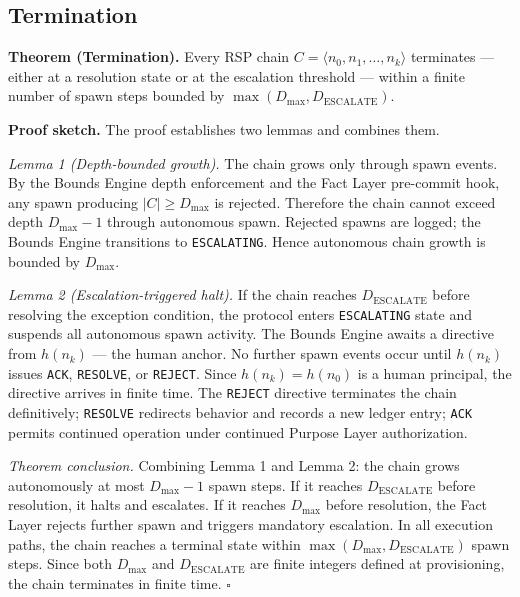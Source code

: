 \subsection{Termination}
\label{sec:rs-termination}

\medskip
\noindent\textbf{Theorem (Termination).} Every RSP chain $C = \langle n_0, n_1, \ldots, n_k \rangle$ terminates --- either at a resolution state or at the escalation threshold --- within a finite number of spawn steps bounded by $\max(D_{\mathrm{max}}, D_{\mathrm{ESCALATE}})$.

\medskip
\noindent\textbf{Proof sketch.} The proof establishes two lemmas and combines them.

\medskip
\textit{Lemma 1 (Depth-bounded growth).} The chain grows only through spawn events. By the Bounds Engine depth enforcement and the Fact Layer pre-commit hook, any spawn producing $|C| \geq D_{\mathrm{max}}$ is rejected. Therefore the chain cannot exceed depth $D_{\mathrm{max}} - 1$ through autonomous spawn. Rejected spawns are logged; the Bounds Engine transitions to \texttt{ESCALATING}. Hence autonomous chain growth is bounded by $D_{\mathrm{max}}$.

\medskip
\textit{Lemma 2 (Escalation-triggered halt).} If the chain reaches $D_{\mathrm{ESCALATE}}$ before resolving the exception condition, the protocol enters \texttt{ESCALATING} state and suspends all autonomous spawn activity. The Bounds Engine awaits a directive from $h(n_k)$ --- the human anchor. No further spawn events occur until $h(n_k)$ issues \texttt{ACK}, \texttt{RESOLVE}, or \texttt{REJECT}. Since $h(n_k) = h(n_0)$ is a human principal, the directive arrives in finite time. The \texttt{REJECT} directive terminates the chain definitively; \texttt{RESOLVE} redirects behavior and records a new ledger entry; \texttt{ACK} permits continued operation under continued Purpose Layer authorization.

\medskip
\textit{Theorem conclusion.} Combining Lemma 1 and Lemma 2: the chain grows autonomously at most $D_{\mathrm{max}} - 1$ spawn steps. If it reaches $D_{\mathrm{ESCALATE}}$ before resolution, it halts and escalates. If it reaches $D_{\mathrm{max}}$ before resolution, the Fact Layer rejects further spawn and triggers mandatory escalation. In all execution paths, the chain reaches a terminal state within $\max(D_{\mathrm{max}}, D_{\mathrm{ESCALATE}})$ spawn steps. Since both $D_{\mathrm{max}}$ and $D_{\mathrm{ESCALATE}}$ are finite integers defined at provisioning, the chain terminates in finite time. $\square$

